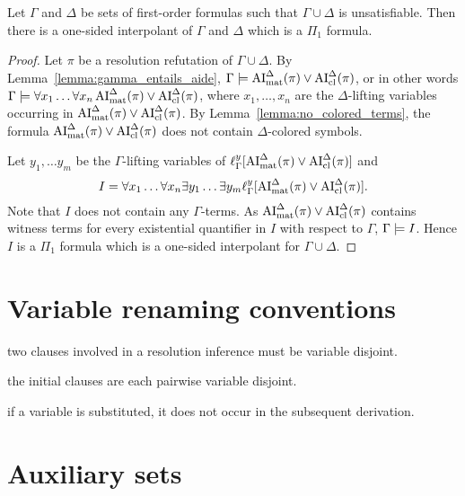 \documentclass[,%
	draft=false,%
	numbers=noendperiod
	11pt,
	a4paper,
	oneside,%
	openany,
]{memoir}
\begin{document}
\begin{prop}
	Let $\Gamma$ and $\Delta$ be sets of first-order formulas such that $\Gamma\cup\Delta$ is unsatisfiable.
	Then there is a one-sided interpolant of $\Gamma$ and $\Delta$ which is a $\Pi_1$ formula.
\end{prop}
\begin{proof}
	Let $\pi$ be a resolution refutation of $\Gamma\cup\Delta$.
	By Lemma~\ref{lemma:gamma_entails_aide}, $\Gamma \models \operatorname{AI}_\mathrm{mat}^\Delta(\pi) \lor \operatorname{AI}_\mathrm{cl}^\Delta(\pi)$,
	or in other words
	$\Gamma \models \forall x_1 \dots \forall x_n  \operatorname{AI}_\mathrm{mat}^\Delta(\pi) \lor \operatorname{AI}_\mathrm{cl}^\Delta(\pi)$, where $x_1, \dots, x_n$ are the $\Delta$-lifting variables occurring in $\operatorname{AI}_\mathrm{mat}^\Delta(\pi) \lor \operatorname{AI}_\mathrm{cl}^\Delta(\pi)$.
	By Lemma~\ref{lemma:no_colored_terms}, the formula $\operatorname{AI}_\mathrm{mat}^\Delta(\pi) \lor \operatorname{AI}_\mathrm{cl}^\Delta(\pi)$ does not contain $\Delta$-colored symbols.

	Let $y_1, \dots y_m$ be the $\Gamma$-lifting variables of $\ell_{\Gamma}^{y}[\operatorname{AI}_\mathrm{mat}^\Delta(\pi) \lor \operatorname{AI}_\mathrm{cl}^\Delta(\pi)]$
	and
	\[I = \forall x_1 \dots \forall x_n \exists y_1 \dots \exists y_m \ell_{\Gamma}^{y}[\operatorname{AI}_\mathrm{mat}^\Delta(\pi) \lor \operatorname{AI}_\mathrm{cl}^\Delta(\pi)].\]
	Note that $I$ does not contain any $\Gamma$-terms.
	As $\operatorname{AI}_\mathrm{mat}^\Delta(\pi) \lor \operatorname{AI}_\mathrm{cl}^\Delta(\pi)$ contains witness terms for every existential quantifier in $I$ with respect to $\Gamma$, $\Gamma \models I$.
	Hence $I$ is a $\Pi_1$ formula which is a one-sided interpolant for $\Gamma \cup \Delta$.
\end{proof}

\section{Variable renaming conventions}


two clauses involved in a resolution inference must be variable disjoint.

the initial clauses are each pairwise variable disjoint.

if a variable is substituted, it does not occur in the subsequent derivation.




\section{Auxiliary sets}
\end{document}
